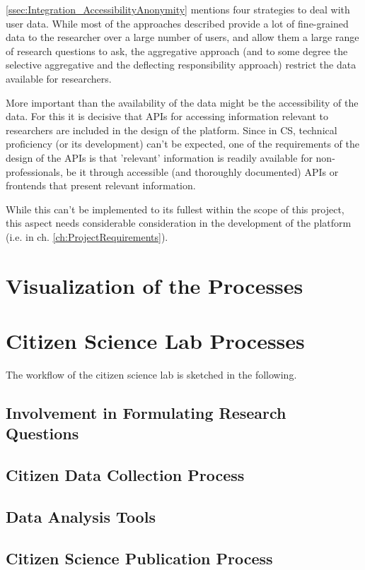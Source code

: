\ref{ssec:Integration_AccessibilityAnonymity} mentions four strategies to deal with user data. While most of the approaches described provide a lot of fine-grained data to the researcher over a large number of users, and allow them a large range of research questions to ask, the aggregative approach (and to some degree the selective aggregative and the deflecting responsibility approach) restrict the data available for researchers. 

More important than the availability of the data might be the accessibility of the data. For this it is decisive that APIs for accessing information relevant to researchers are included in the design of the platform. Since in CS, technical proficiency (or its development) can't be expected, one of the requirements of the design of the APIs is that 'relevant' information is readily available for non-professionals, be it through accessible (and thoroughly documented) APIs or frontends that present relevant information.

While this can't be implemented to its fullest within the scope of this project, this aspect needs considerable consideration in the development of the platform (i.e. in ch. \ref{ch:ProjectRequirements}).

\section{Visualization of the Processes}
\label{sec:Model_Visualization}

\section{Citizen Science Lab Processes}
\label{sec:CSLab_Processes}


The workflow of the citizen science lab is sketched in the following.

\subsection{Involvement in Formulating Research Questions}

\subsection{Citizen Data Collection Process}

\subsection{Data Analysis Tools}

\subsection{Citizen Science Publication Process}